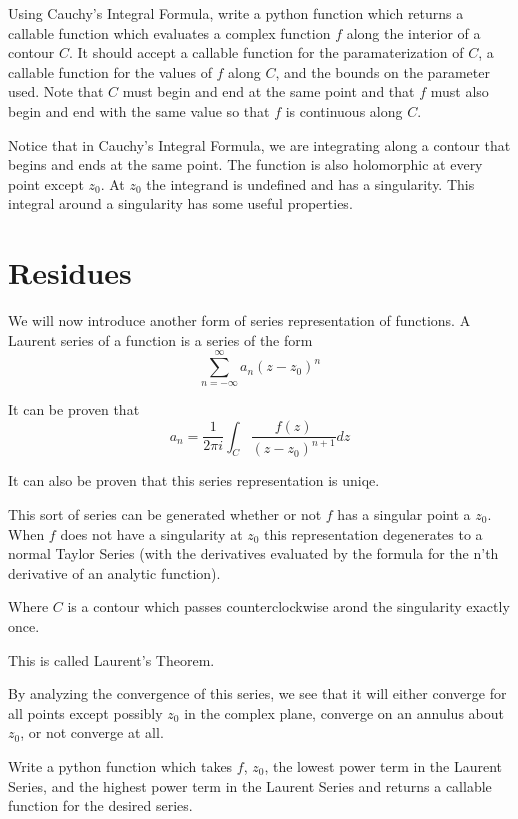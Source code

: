 \begin{problem}
Using Cauchy's Integral Formula, write a python function which returns a callable function which evaluates a complex function $f$ along the interior of a contour $C$. It should accept a callable function for the paramaterization of $C$, a callable function for the values of $f$ along $C$, and the bounds on the parameter used. Note that $C$ must begin and end at the same point and that $f$ must also begin and end with the same value so that $f$ is continuous along $C$.
\end{problem}

Notice that in Cauchy's Integral Formula, we are integrating along a contour that begins and ends at the same point. The function is also holomorphic at every point except $z_0$. At $z_0$ the integrand is undefined and has a singularity. This integral around a singularity has some useful properties.

\section*{Residues}

We will now introduce another form of series representation of functions. A Laurent series of a function is a series of the form $$\sum_{n= -\infty}^{\infty} a_n (z-z_0)^n$$

It can be proven that 
$$a_n = \frac{1}{2\pi i} \int_C \frac{f(z)}{(z-z_0)^{n+1}} dz$$ 

It can also be proven that this series representation is uniqe.

This sort of series can be generated whether or not $f$ has a singular point a $z_0$. When $f$ does not have a singularity at $z_0$ this representation degenerates to a normal Taylor Series (with the derivatives evaluated by the formula for the n'th derivative of an analytic function). 

Where $C$ is a contour which passes counterclockwise arond the singularity exactly once.

This is called Laurent's Theorem.

By analyzing the convergence of this series, we see that it will either converge for all points except possibly $z_0$ in the complex plane, converge on an annulus about $z_0$, or not converge at all.

\begin{problem}
Write a python function which takes $f$, $z_0$, the lowest power term in the Laurent Series, and the highest power term in the Laurent Series and returns a callable function for the desired series.
\end{problem}

